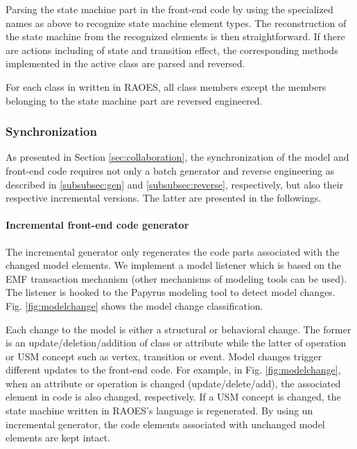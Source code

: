 \begin{description}[\footnotesize]
	\item[Step 1] Parsing the state machine part in the front-end code by using the specialized names as above to recognize state machine element types.
	The reconstruction of the state machine from the recognized elements is then straightforward.
	If there are actions including  of state and transition effect, the corresponding methods implemented in the active class are parsed and reversed.
	
	\item[Step 2] For each class in written in RAOES, all class members except the members belonging to the state machine part are reversed engineered.
\end{description}

\noindent
\subsubsection{Synchronization}
As presented in Section \ref{sec:collaboration}, the synchronization of the model and front-end code requires not only a batch generator and reverse engineering as described in \ref{subsubsec:gen} and \ref{subsubsec:reverse}, respectively, but also their respective incremental versions.
The latter are presented in the followings.
 
\noindent
\paragraph{Incremental front-end code generator}
The incremental generator only regenerates the code parts associated with the changed model elements.
We implement a model listener which is based on the EMF transaction mechanism (other mechanisms of modeling tools can be used).
The listener is hooked to the Papyrus modeling tool to detect model changes.
Fig. \ref{fig:modelchange} shows the model change classification. 

Each change to the model is either a structural or behavioral change.
The former is an update/deletion/addition of class or attribute while the latter of operation or USM concept such as vertex, transition or event. 
Model changes trigger different updates to the front-end code.
For example, in Fig. \ref{fig:modelchange}, when an attribute or operation is changed (update/delete/add), the associated element in code is also changed, respectively.
If a USM concept is changed, the state machine written in RAOES's language is regenerated.
By using un incremental generator, the code elements associated with unchanged model elements are kept intact.

